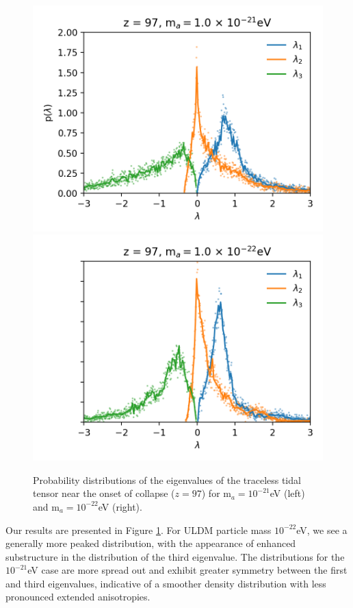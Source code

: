 \documentclass[a4paper,11pt]{article}
\begin{document}
\begin{figure}[!htb]
\centering
{}
  \includegraphics[trim={1cm 0 2cm 0.2cm},scale=0.75]{ev_z97_1e-21.png}
\endminipage\hfill
{}%
  \includegraphics[trim={1cm 0 2cm 0.1cm},scale=0.75]{ev_z97_1e-22.png}
\endminipage
\caption{Probability distributions of the eigenvalues of the traceless tidal tensor near the onset of collapse ($z=97$) for m$_a = 10^{-21}$eV (left) and m$_a = 10^{-22}$eV (right).}\label{fig:prob_distros}
\end{figure}

Our results are presented in Figure \ref{fig:prob_distros}. For ULDM particle mass $10^{-22}$eV, we see a generally more peaked distribution, with the appearance of enhanced substructure in the distribution of the third eigenvalue. The distributions for the $10^{-21}$eV case are more spread out and exhibit greater symmetry between the first and third eigenvalues, indicative of a smoother density distribution with less pronounced extended anisotropies. 
\end{document}
